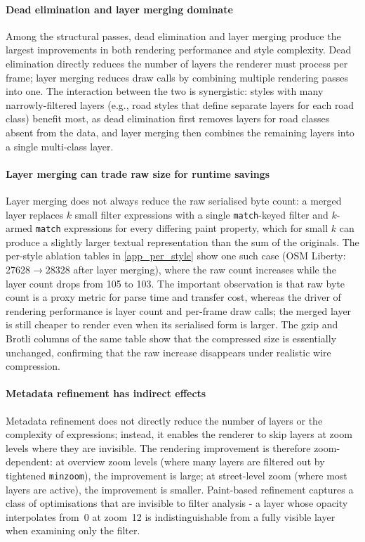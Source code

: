 \paragraph{Dead elimination and layer merging dominate}
Among the structural passes, dead elimination and layer merging produce the largest improvements in both rendering performance and style complexity.
Dead elimination directly reduces the number of layers the renderer must process per frame; layer merging reduces draw calls by combining multiple rendering passes into one.
The interaction between the two is synergistic: styles with many narrowly-filtered layers (e.g., road styles that define separate layers for each road class) benefit most, as dead elimination first removes layers for road classes absent from the data, and layer merging then combines the remaining layers into a single multi-class layer.

\paragraph{Layer merging can trade raw size for runtime savings}
Layer merging does not always reduce the raw serialised byte count: a merged layer replaces $k$ small filter expressions with a single \texttt{match}-keyed filter and $k$-armed \texttt{match} expressions for every differing paint property, which for small $k$ can produce a slightly larger textual representation than the sum of the originals.
The per-style ablation tables in \cref{app_per_style} show one such case (OSM Liberty: \num{27628}$\to$\qty{28328}{\byte} after layer merging), where the raw count increases while the layer count drops from 105 to 103.
The important observation is that raw byte count is a proxy metric for parse time and transfer cost, whereas the driver of rendering performance is layer count and per-frame draw calls; the merged layer is still cheaper to render even when its serialised form is larger.
The gzip and Brotli columns of the same table show that the compressed size is essentially unchanged, confirming that the raw increase disappears under realistic wire compression.

\paragraph{Metadata refinement has indirect effects}
Metadata refinement does not directly reduce the number of layers or the complexity of expressions; instead, it enables the renderer to skip layers at zoom levels where they are invisible.
The rendering improvement is therefore zoom-dependent: at overview zoom levels (where many layers are filtered out by tightened \texttt{minzoom}), the improvement is large; at street-level zoom (where most layers are active), the improvement is smaller.
Paint-based refinement captures a class of optimisations that are invisible to filter analysis - a layer whose opacity interpolates from~0 at zoom~12 is indistinguishable from a fully visible layer when examining only the filter.

